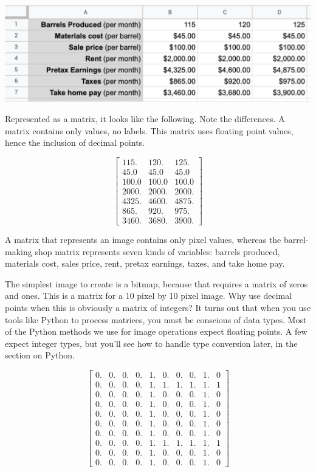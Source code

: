 \includegraphics[width=1.0\textwidth]{spreadsheet.png}

Represented as a matrix, it looks like the following. Note the differences. A matrix contains only values, no labels. This matrix uses floating point values, hence the inclusion of decimal points. 

$$\begin{bmatrix}
115. & 120. & 125.\\
45.0 & 45.0 & 45.0\\
100.0 & 100.0 & 100.0\\
2000. & 2000. & 2000.\\
4325. & 4600. & 4875.\\
865. & 920. & 975.\\
3460. & 3680. & 3900.
\end{bmatrix}$$
 
A matrix that represents an image contains only pixel values, whereas the barrel-making shop matrix represents seven kinds of variables: barrels produced, materials cost, sales price, rent, pretax earnings, taxes, and take home pay. 

The simplest image to create is a bitmap, because that requires a matrix of zeros and ones. This is a matrix for a 10 pixel by 10 pixel image. Why use decimal points when this is obviously a matrix of integers? It turns out that when you use tools like Python to process matrices, you must be conscious of data types. Most of the Python methods we use for image operations expect floating points. A few expect integer types, but you'll see how to handle type conversion later, in the section on Python. 

$$\begin{bmatrix}
0. & 0. & 0. & 0. & 1. & 0. & 0. & 0. & 1. & 0\\
0. & 0. & 0. & 0. & 1. & 1. & 1. & 1. & 1. & 1\\
0. & 0. & 0. & 0. & 1. & 0. & 0. & 0. & 1. & 0\\
0. & 0. & 0. & 0. & 1. & 0. & 0. & 0. & 1. & 0\\
0. & 0. & 0. & 0. & 1. & 0. & 0. & 0. & 1. & 0\\
0. & 0. & 0. & 0. & 1. & 0. & 0. & 0. & 1. & 0\\
0. & 0. & 0. & 0. & 1. & 0. & 0. & 0. & 1. & 0\\
0. & 0. & 0. & 0. & 1. & 1. & 1. & 1. & 1. & 1\\
0. & 0. & 0. & 0. & 1. & 0. & 0. & 0. & 1. & 0\\
0. & 0. & 0. & 0. & 1. & 0. & 0. & 0. & 1. & 0
\end{bmatrix}$$

